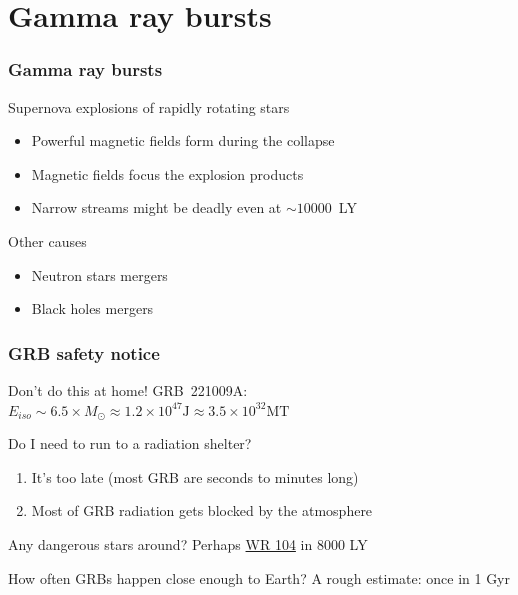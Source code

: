 \documentclass[aspectratio=169]{beamer}
\begin{document}
\section{Gamma ray bursts}
\begin{frame}
\frametitle{Gamma ray bursts}
\begin{block}{Supernova explosions of rapidly rotating stars}
\begin{itemize}
\item Powerful magnetic fields form during the collapse
\item Magnetic fields focus the explosion products
\item Narrow streams might be deadly even at $\sim 10000$~LY
\end{itemize}
\end{block}
\begin{block}{Other causes}
\begin{itemize}
\item Neutron stars mergers
\item Black holes mergers
\end{itemize}
\end{block}
\end{frame}

\begin{frame}
\frametitle{GRB safety notice}
\begin{block}{Don't do this at home!}
GRB~221009A: $E_{iso} \sim 6.5 \times M_\odot \approx 1.2 \times 10^{47} \mathrm{J} \approx 3.5 \times 10^{32} \mathrm{MT}$  \cite{arXiv:2302.13383}
\end{block}

\begin{block}{Do I need to run to a radiation shelter?}
\begin{enumerate}
\item It's too late (most GRB are seconds to minutes long)
\item Most of GRB radiation gets blocked by the atmosphere
\end{enumerate}
\end{block}

\begin{block}{Any dangerous stars around?}
Perhaps \href{https://en.wikipedia.org/wiki/WR_104}{WR 104} in 8000 LY
\end{block}

\begin{block}{How often GRBs happen close enough to Earth?}
A rough estimate: once in 1 Gyr
\end{block}
\end{frame}
\end{document}

